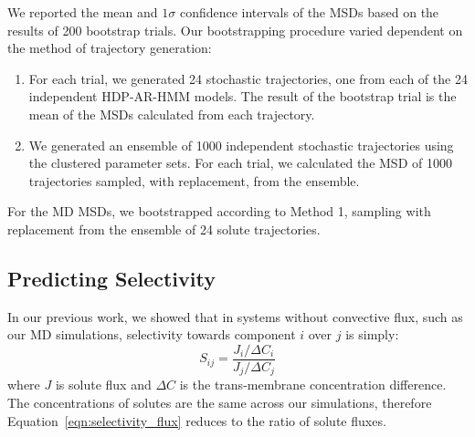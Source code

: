 \documentclass[journal=jpcbfk,manuscript=article]{achemso}
\begin{document}
  We reported the mean and $1 \sigma$ confidence intervals of the MSDs based on the 
  results of 200 bootstrap trials. Our bootstrapping procedure varied dependent on the
  method of trajectory generation:
  \begin{enumerate}[label={Method \theenumi :}, leftmargin=3.5\parindent]
  	\item For each trial, we generated 24 stochastic trajectories, one from each of
  	the 24 independent HDP-AR-HMM models. The result of the bootstrap trial is the mean
  	of the MSDs calculated from each trajectory. 
    \item We generated an ensemble of 1000 independent stochastic trajectories using
    the clustered parameter sets. For each trial, we calculated the MSD of 1000 
    trajectories sampled, with replacement, from the ensemble.
  \end{enumerate}

  For the MD MSDs, we bootstrapped according to Method 1, sampling with 
  replacement from the ensemble of 24 solute trajectories.
  
  \subsection{Predicting Selectivity}\label{method:selectivity}
  
  In our previous work, we showed that in systems without convective flux, such
  as our MD simulations, selectivity towards component $i$ over $j$ is simply:
  \begin{equation}
  S_{ij} = \frac{J_i / \Delta C_i}{J_j / \Delta C_j}
  \label{eqn:selectivity_flux}
  \end{equation}
  where $J$ is solute flux and $\Delta C$ is the trans-membrane concentration
  difference.~\cite{coscia_capturing_2020} The concentrations of solutes are the
  same across our simulations, therefore Equation~\ref{eqn:selectivity_flux} 
  reduces to the ratio of solute fluxes. 
  
\end{document}
